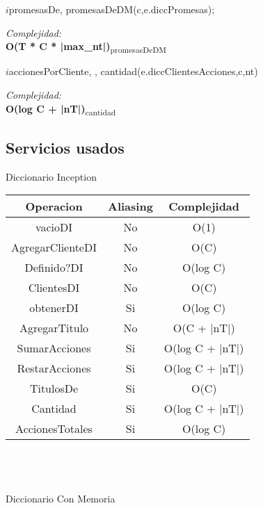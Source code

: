 \begin{algorithm}{$i$promesasDe}{,  }{}
				\RETURN promesasDeDM(c,e.diccPromesas);
			\end{algorithm}		
\textit{Complejidad:}  \\
\textbf{O(T * C * |max\_nt|)}\textsubscript{promesasDeDM} \\
			
\begin{algorithm}{$i$accionesPorCliente}{, , }{}
			\RETURN cantidad(e.diccClientesAcciones,c,nt) \\
			\end{algorithm}
\textit{Complejidad:}  \\
\textbf{O(log C + |nT|)}\textsubscript{cantidad}
\newpage

\subsection{Servicios usados}
\begin{LARGE}
Diccionario Inception

\end{LARGE}
\begin{tabular}[c]{|c|c|c|}
		\hline
		Operacion & Aliasing & Complejidad \\
		\hline
		vacioDI & No &  O(1)\\
		\hline
		AgregarClienteDI & No &  O(C)\\
		\hline
		Definido?DI & No &  O(log C)\\
		\hline
		ClientesDI & No &  O(C)\\
		\hline
		obtenerDI & Si &  O(log C)\\
		\hline
		AgregarTitulo & No &  O(C + |nT|)\\
		\hline
		SumarAcciones & Si &  O(log C + |nT|)\\
		\hline
		RestarAcciones & Si &  O(log C + |nT|)\\
		\hline
		TitulosDe & Si &  O(C)\\
		\hline
		Cantidad & Si &  O(log C + |nT|)\\
		\hline
		AccionesTotales & Si &  O(log C)\\
		\hline
	\end{tabular}\\\\
\\
{\LARGE Diccionario Con Memoria} \\

